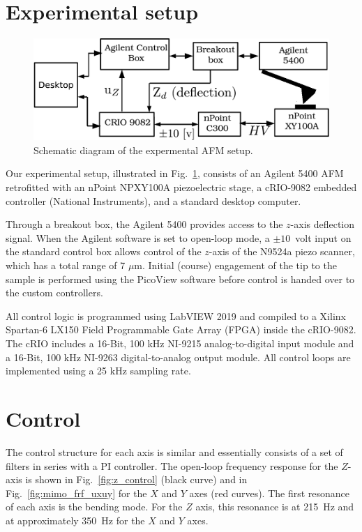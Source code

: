 \documentclass[twocolumn,oneside]{IEEEtran/IEEEtran}
\begin{document}
\section{Experimental setup} \label{sec:experimentalSetup}
\begin{figure}[ht!]
  \includegraphics[width=1\columnwidth]{figures/exp_setup.pdf}
  \caption{Schematic diagram of the expermental AFM setup.}
  \label{fig:exp_setup}
\end{figure}

Our experimental setup, illustrated in Fig.~\ref{fig:exp_setup},
consists of an Agilent 5400 AFM  retrofitted with an nPoint NPXY100A
piezoelectric stage, a cRIO-9082 embedded controller (National
Instruments), and a standard desktop computer. 

Through a breakout box, the Agilent 5400 provides access to the $z$-axis deflection signal. When the Agilent software is set to open-loop mode, a $\pm10$~volt input on the standard control box allows control of the $z$-axis of the N9524a piezo scanner, which has a total range of 7 $\mu$m.
Initial (course) engagement of the tip to the
sample is performed using the PicoView software before control is handed over to
the custom controllers.
	
All control logic is programmed using LabVIEW 2019 and compiled to a Xilinx
Spartan-6 LX150 Field Programmable Gate Array (FPGA) inside the cRIO-9082. The
cRIO includes a 16-Bit, 100 kHz NI-9215 analog-to-digital input module and a
16-Bit, 100 kHz NI-9263 digital-to-analog output module. All control loops are
implemented using a 25 kHz sampling rate.


\section{Control}\label{sec:control}
The control structure for each axis is similar and essentially consists of a set of filters in series with a PI controller. The open-loop frequency response for the $Z$-axis is shown in Fig.~\ref{fig:z_control} (black curve) and in Fig.~\ref{fig:mimo_frf_uxuy} for the $X$ and $Y$ axes (red curves). The first resonance of each axis is the bending mode. For the $Z$ axis, this resonance is at 215~Hz and at approximately 350~Hz for the $X$ and $Y$ axes.
\end{document}
